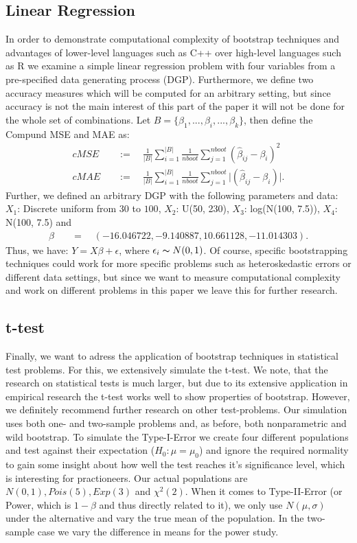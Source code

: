 \subsection{Linear Regression}
In order to demonstrate computational complexity of bootstrap techniques and advantages of lower-level languages such as C++ over high-level languages such as R we examine a simple linear regression problem with four variables from a pre-specified data generating process (DGP). Furthermore, we define two accuracy measures which will be computed for an arbitrary setting, but since accuracy is not the main interest of this part of the paper it will not be done for the whole set of combinations. Let $B  = \{\beta_1, ..., \beta_i, ..., \beta_k\}$, then define the Compund MSE and MAE as:
\begin{align*}
cMSE \quad &:= \quad \frac{1}{\lvert B \rvert} \sum_{i = 1}^{\lvert B \rvert} \frac{1}{nboot} \sum_{j = 1}^{nboot} (\hat{\beta}_{ij} - \beta_i)^2 \\
cMAE \quad &:= \quad \frac{1}{\lvert B \rvert} \sum_{i = 1}^{\lvert B \rvert} \frac{1}{nboot} \sum_{j = 1}^{nboot} \lvert (\hat{\beta}_{ij} - \beta_i) \rvert.
\end{align*}
Further, we defined an arbitrary DGP with the following parameters and data: $X_1$: Discrete uniform from $30$ to $100$, $X_2$: U(50, 230), $X_3$: log(N(100, 7.5)), $X_4$: N(100, 7.5) and \begin{align*}
\beta \quad  &= \quad (-16.046722, -9.140887, 10.661128, -11.014303).
\end{align*}
Thus, we have: $Y = X\beta + \epsilon$, where $\epsilon_i \thicksim N(0,1)$. Of course, specific bootstrapping techniques could work for more specific problems such as heteroskedastic errors or different data settings, but since we want to measure computational complexity and work on different problems in this paper we leave this for further research.

\subsection{t-test}
Finally, we want to adress the application of bootstrap techniques in statistical test problems. For this, we extensively simulate the t-test. We note, that the research on statistical tests is much larger, but due to its extensive application in empirical research the t-test works well to show properties of bootstrap. However, we definitely recommend further research on other test-problems. Our simulation uses both one- and two-sample problems and, as before, both nonparametric and wild bootstrap. To simulate the Type-I-Error we create four different populations and test against their expectation ($H_0: \mu = \mu_0$) and ignore the required normality to gain some insight about how well the test reaches it's significance level, which is interesting for practioneers. Our actual populations are $N(0,1), Pois(5), Exp(3)$ and $\chi^2(2)$. When it comes to Type-II-Error (or Power, which is $1-\beta$ and thus directly related to it), we only use $N(\mu, \sigma)$ under the alternative and vary the true mean of the population. In the two-sample case we vary the difference in means for the power study. 